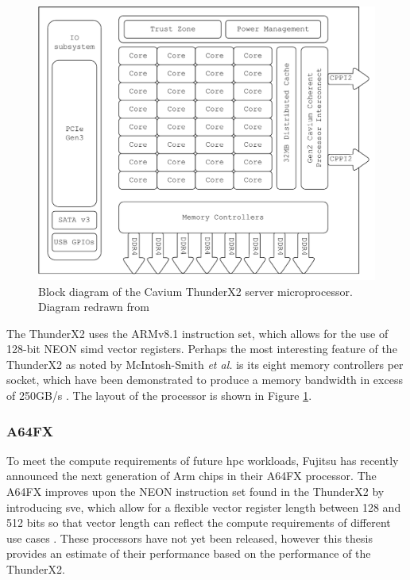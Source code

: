 \documentclass[a4paper,11pt]{report}
\begin{document}
\begin{figure}[htbp]
\begin{center}
\includegraphics[width=1\textwidth]{img/thunderx2.pdf}
\caption[Block diagram of the Cavium ThunderX2 server microprocessor]{Block diagram of the Cavium ThunderX2 server microprocessor. Diagram redrawn from \cite{thunderprocessor2018brief}}
\label{fig:thunderx2}
\end{center}
\end{figure}
\par
The ThunderX2 uses the ARMv8.1 instruction set, which allows for the use of 128-bit NEON \gls{simd} vector registers. Perhaps the most interesting feature of the ThunderX2 as noted by McIntosh-Smith \textit{et al.} is its eight memory controllers per socket, which have been demonstrated to produce a memory bandwidth in excess of 250GB/s \cite{mcintosh2018performance}. The layout of the processor is shown in Figure \ref{fig:thunderx2}.

\subsubsection{A64FX}
To meet the compute requirements of future \gls{hpc} workloads, Fujitsu has recently announced the next generation of Arm chips in their A64FX processor. The A64FX improves upon the NEON instruction set found in the ThunderX2 by introducing \gls{sve}, which allow for a flexible vector register length between 128 and 512 bits so that vector length can reflect the compute requirements of different use cases \cite{stephens2017arm, rico2017arm}. These processors have not yet been released, however this thesis provides an estimate of their performance based on the performance of the ThunderX2.
\end{document}
